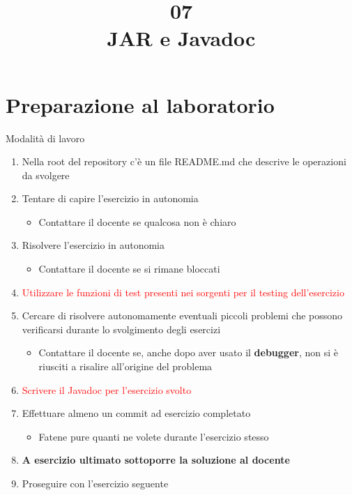 \documentclass[presentation]{beamer}
\title[Jar e Javadoc]{07 \\JAR e Javadoc}
\begin{document}
	
\frame[label=coverpage]{\titlepage}

\newcommand{\al}[0]{\textless}
\newcommand{\ar}[0]{\textgreater}
\newcommand{\gen}[1]{\al{}#1\ar{}}
\newcommand{\imgfr}[4]{\fr{#1}{#2
\begin{center}
\texttt{[image: \#4]}                    
\end{center}
}}


\section{Preparazione al laboratorio}

\begin{frame}{Modalità di lavoro}
	\begin{enumerate}
		\item Nella root del repository c'è un file README.md che descrive le operazioni da svolgere
		\item Tentare di capire l'esercizio in autonomia
		\begin{itemize}
			\item Contattare il docente se qualcosa non è chiaro
		\end{itemize}
		\item Risolvere l'esercizio in autonomia
		\begin{itemize}
			\item Contattare il docente se si rimane bloccati
		\end{itemize}
		\item \textcolor{red}{Utilizzare le funzioni di test presenti nei sorgenti per il testing dell'esercizio}
		\item Cercare di risolvere autonomamente eventuali piccoli problemi che possono verificarsi durante lo svolgimento degli esercizi
		\begin{itemize}
			\item Contattare il docente se, anche dopo aver usato il \textbf{debugger}, non si è riusciti a risalire all'origine del problema
		\end{itemize}
		\item \textcolor{red}{Scrivere il Javadoc per l'esercizio svolto} 
		\item Effettuare almeno un commit ad esercizio completato
		\begin{itemize}
			\item Fatene pure quanti ne volete durante l'esercizio stesso
		\end{itemize}
		\item \textbf{A esercizio ultimato sottoporre la soluzione al docente}
		\item Proseguire con l'esercizio seguente
	\end{enumerate}
\end{frame}
\end{document}
